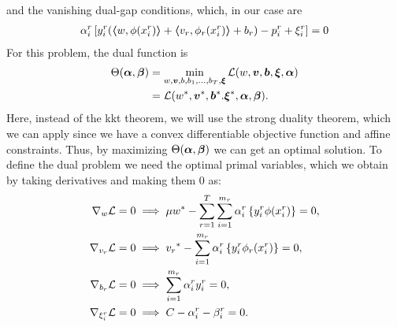 and the vanishing dual-gap conditions, which, in our case are
\begin{align}
    \alpha_i^r \left[ y_{i}^r (\dotp{w}{\phi(x_{i}^r)} + \dotp{v_r}{\phi_r(x_{i}^r)} + b_r) - p_{i}^r + \xi_{i}^r \right] = 0 \label{eq:dualgap_vanish}
\end{align}
For this problem, the dual function is
\begin{equation}\nonumber
    \begin{aligned}
         \Theta(\bm{\alpha}, \bm{\beta}) &=  \min_{{w}, \bm{v}, b, b_1, \ldots, b_T, \bm{\xi}} \mathcal{L}({w}, \bm{v}, \bm{b}, \bm{\xi}, \bm{\alpha}) \\
         &= \mathcal{L}({{w}}^*, {\bm{v}}^*, {\bm{b}}^*. {\bm{\xi}}^*, \bm{\alpha}, \bm{\beta}) .
    \end{aligned}    
\end{equation}
Here, instead of the \acrshort{kkt} theorem, we will use the strong duality theorem, which we can apply since we have a convex differentiable objective function and affine constraints.
Thus, by maximizing $\Theta(\bm{\alpha}, \bm{\beta})$ we can get an optimal solution.
To define the dual problem we need the optimal primal variables, which we obtain by taking derivatives and making them $0$ as:
\begin{align}
    \grad_{{w}} \lagr  = 0  &\implies \mu \optim{{w}} - \sum_{r= 1}^T \sum_{i=1}^{m_r} {\alpha_i^r} \left\lbrace y_i^r \phi(x_i^r) \right\rbrace = 0 , \label{eq:common_repr_add} \\
    \grad_{{v}_r} \lagr  = 0 &\implies \optim{{v}_r} - \sum_{i=1}^{m_r} {\alpha_i^r} \left\lbrace y_i^r \phi_r(x_i^r) \right\rbrace = 0 , \label{eq:specific_repr_add} \\
    \grad_{b_r} \lagr  = 0 &\implies \sum_{i=1}^{m_r} {\alpha_i^r} y_i^r = 0 , \label{eq:specific_eqconstr_add} \\
    \grad_{\xi_i^r} \lagr  = 0 &\implies C - {\alpha_i^r} - {\beta_i^r} = 0 .\label{eq:xi_feas_add}
\end{align}
